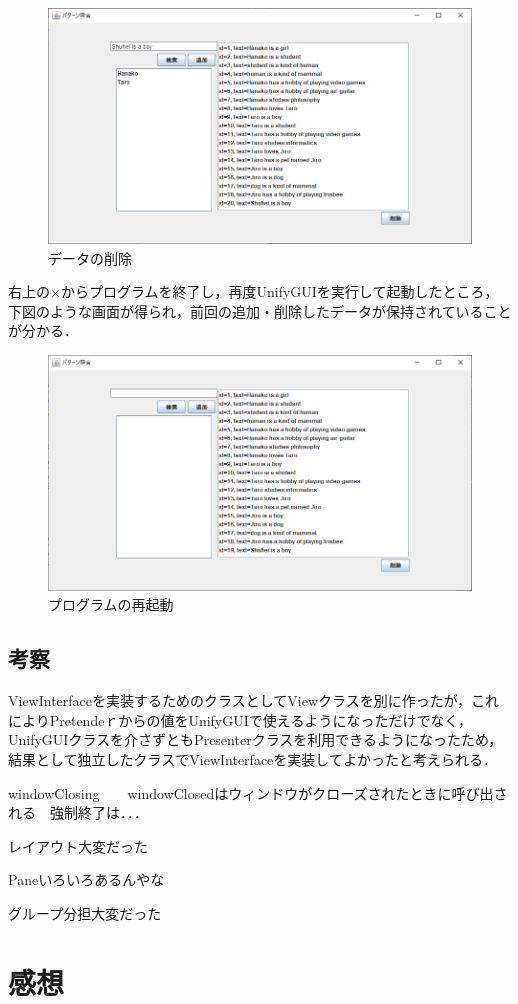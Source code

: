 \documentclass[12pt]{jarticle}
\begin{document}
\begin{figure}[!hbt]
  	\begin{center}
  		\includegraphics[scale=0.60]{images/scs2-3-4.png}
	\end{center}
  	\caption{データの削除}
\end{figure}
\clearpage

右上の×からプログラムを終了し，再度UnifyGUIを実行して起動したところ，下図のような画面が得られ，前回の追加・削除したデータが保持されていることが分かる．

\begin{figure}[!hbt]
  	\begin{center}
  		\includegraphics[scale=0.60]{images/scs2-3-5.png}
	\end{center}
  	\caption{プログラムの再起動}
\end{figure}
\clearpage

\subsection{考察}
ViewInterfaceを実装するためのクラスとしてViewクラスを別に作ったが，これによりPretendeｒからの値をUnifyGUIで使えるようになっただけでなく，UnifyGUIクラスを介さずともPresenterクラスを利用できるようになったため，結果として独立したクラスでViewInterfaceを実装してよかったと考えられる．

windowClosing　　windowClosedはウィンドウがクローズされたときに呼び出される　強制終了は．．．

レイアウト大変だった

Paneいろいろあるんやな

グループ分担大変だった




\section{感想}
\end{document}
